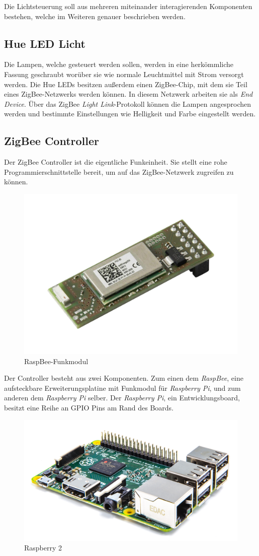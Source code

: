 \documentclass[a4paper,12pt]{article}
\begin{document}
\noindent
Die Lichtsteuerung soll aus mehreren miteinander interagierenden Komponenten
bestehen, welche im Weiteren genauer beschrieben werden.

\subsection{Hue LED Licht}

Die Lampen, welche gesteuert werden sollen, werden in eine herkömmliche Fassung
geschraubt worüber sie wie normale Leuchtmittel mit Strom versorgt werden. Die Hue LEDs
besitzen außerdem einen ZigBee-Chip, mit dem sie Teil eines ZigBee-Netzwerks werden
können. In diesem Netzwerk arbeiten sie als \emph{End Device}. Über das ZigBee
\emph{Light Link}-Protokoll können die Lampen angesprochen werden und bestimmte
Einstellungen wie Helligkeit und Farbe eingestellt werden.

\newpage

\subsection{ZigBee Controller}

Der ZigBee Controller ist die eigentliche Funkeinheit. Sie stellt eine rohe
Programmierschnittstelle bereit, um auf das ZigBee-Netzwerk zugreifen zu können.

\begin{figure}[h!]
	\centering
	\includegraphics[width=0.4\linewidth]{img/raspbee}
	\caption{RaspBee-Funkmodul}
\end{figure}

Der Controller besteht aus zwei Komponenten. Zum einen dem \emph{RaspBee}, eine
aufsteckbare Erweiterungsplatine mit Funkmodul für \emph{Raspberry Pi}, und zum
anderen dem \emph{Raspberry Pi} selber. Der \emph{Raspberry Pi}, ein
Entwicklungsboard, besitzt eine Reihe an GPIO Pins am Rand des Boards.

\begin{figure}[h!]
	\centering
	\includegraphics[width=0.7\linewidth]{img/rpi2}
	\caption{Raspberry 2}
\end{figure}
\end{document}
